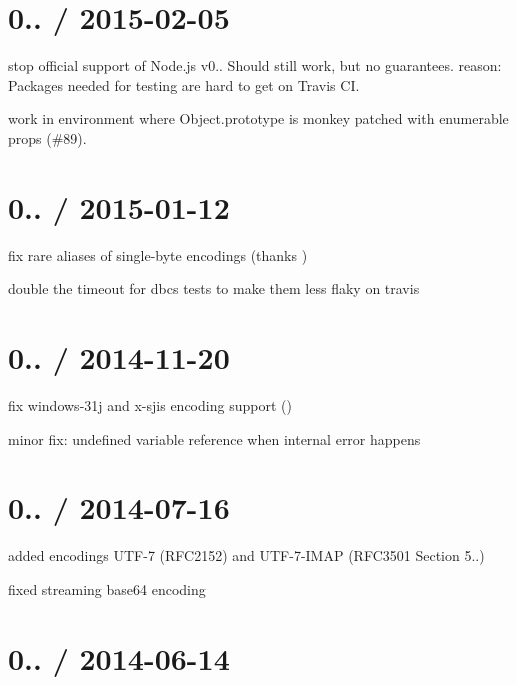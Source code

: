 \section*{0.. / 2015-\/02-\/05}


\begin{DoxyItemize}
\item stop official support of Node.\+js v0.. Should still work, but no guarantees. reason\+: Packages needed for testing are hard to get on Travis CI.
\item work in environment where Object.\+prototype is monkey patched with enumerable props (\#89).
\end{DoxyItemize}

\section*{0.. / 2015-\/01-\/12}


\begin{DoxyItemize}
\item fix rare aliases of single-\/byte encodings (thanks )
\item double the timeout for dbcs tests to make them less flaky on travis
\end{DoxyItemize}

\section*{0.. / 2014-\/11-\/20}


\begin{DoxyItemize}
\item fix windows-\/31j and x-\/sjis encoding support ()
\item minor fix\+: undefined variable reference when internal error happens
\end{DoxyItemize}

\section*{0.. / 2014-\/07-\/16}


\begin{DoxyItemize}
\item added encodings U\+T\+F-\/7 (R\+F\+C2152) and U\+T\+F-\/7-\/\+I\+M\+AP (R\+F\+C3501 Section 5..)
\item fixed streaming base64 encoding
\end{DoxyItemize}

\section*{0.. / 2014-\/06-\/14}


